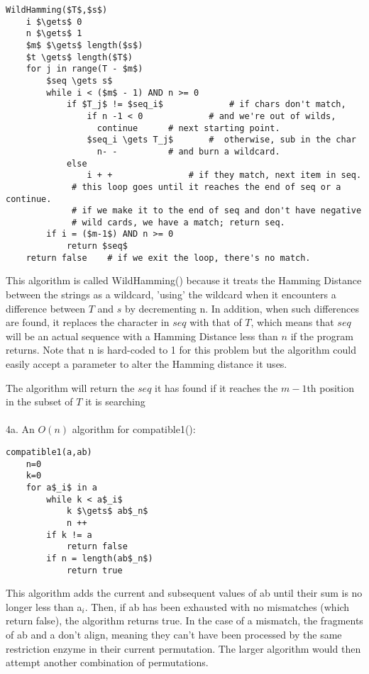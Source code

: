 \documentclass[12pt]{amsart}
\begin{document}
\begin{lstlisting}[mathescape=true]
WildHamming($T$,$s$) 
	i $\gets$ 0 
	n $\gets$ 1
	$m$ $\gets$ length($s$) 
	$t \gets$ length($T$) 
	for j in range(T - $m$)
		$seq \gets s$ 
		while i < ($m$ - 1) AND n >= 0 
			if $T_j$ != $seq_i$ 			# if chars don't match,
			    if n -1 < 0 			# and we're out of wilds,
				  continue		# next starting point.
			    $seq_i \gets T_j$ 		#  otherwise, sub in the char
			   	  n- - 			# and burn a wildcard.
			else 
			    i + + 				# if they match, next item in seq.
			 # this loop goes until it reaches the end of seq or a continue.
			 # if we make it to the end of seq and don't have negative
			 # wild cards, we have a match; return seq.
		if i = ($m-1$) AND n >= 0 
			return $seq$
	return false	# if we exit the loop, there's no match.
\end{lstlisting}

This algorithm is called WildHamming() because it treats the Hamming Distance between the strings as a wildcard, 'using' the wildcard when it encounters a difference between $T$ and $s$ by decrementing n.  In addition, when such differences are found, it replaces the character in $seq$ with that of $T$, which means that $seq$ will be an actual sequence with a Hamming Distance less than $n$ if the program returns.  Note that n is hard-coded to 1 for this problem but the algorithm could easily accept a parameter to alter the Hamming distance it uses.

The algorithm will return the $seq$ it has found if it reaches the $m-1$th position in the subset of $T$ it is searching\\
 \\

\pagebreak[4]
4a. An $O(n)$ algorithm for compatible1(): \\
\begin{lstlisting}[mathescape=true]
compatible1(a,ab)
	n=0
	k=0
	for a$_i$ in a
		while k < a$_i$
			k $\gets$ ab$_n$
			n ++
		if k != a
			return false 
		if n = length(ab$_n$)
			return true
\end{lstlisting}

This algorithm adds the current and subsequent values of ab until their sum is no longer less than a$_i$.  Then, if ab has been exhausted with no mismatches (which return false), the algorithm returns true.  In the case of a mismatch, the fragments of ab and a don't align, meaning they can't have been processed by the same restriction enzyme in their current permutation.  The larger algorithm would then attempt another combination of permutations.
\end{document}
